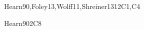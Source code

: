 \begin{syllabus}
\begin{unit}{\GVBasicRendering}{}{Hearn90,Foley13,Wolff11,Shreiner13}{12}{C1,C4}
   \begin{learningoutcomes} 
        \item \GVBasicRenderingLODiscussTheProblem [\Familiarity]
        \item \GVBasicRenderingLODescribeThePipeline [\Familiarity]
        \item \GVBasicRenderingLOCreateADisplay [\Usage]
        \item \GVBasicRenderingLOObtain [\Usage]
        \item \GVBasicRenderingLOApplyDimensional [\Usage]
        \item \GVBasicRenderingLOContrast [\Assessment]
        \item \GVBasicRenderingLOExplainTheApplications [\Familiarity]
        \item \GVBasicRenderingLOExplainTheRasterization [\Familiarity]
        \item \GVBasicRenderingLOImplementA [\Usage]
        \item \GVBasicRenderingLOComputeSpace [\Assessment]
        \item \GVBasicRenderingLOComputeTime [\Assessment]
   \end{learningoutcomes}
\end{unit}

\begin{unit}{\HCIProgrammingInteractiveSystems}{}{Hearn90}{2}{C8}
    \begin{topics}
    	\item \HCIProgrammingInteractiveSystemsTopicEvent
    	\item \HCINewInteractiveTechnologiesTopicApproachesTo
    \end{topics}

    \begin{learningoutcomes}
    	\item \HCINewInteractiveTechnologiesLODiscussTheDisadvantages [\Assessment]
    \end{learningoutcomes}
\end{unit}


\end{syllabus}
